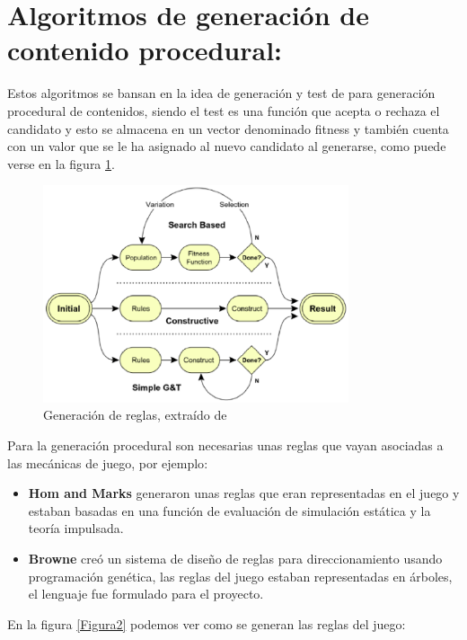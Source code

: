 \section{Algoritmos de generación de contenido procedural:}

Estos algoritmos se bansan en la idea de generación y test de para generación procedural de contenidos, siendo el test es una función que acepta o rechaza el candidato y esto se almacena en un vector denominado fitness y también cuenta con un valor que se le ha asignado al nuevo candidato  al generarse, como puede verse en la figura \ref{Figura1}\cite{B3}.

\begin{figure}[h!]

	\centering
	\includegraphics[width=9cm]{./eps/fig1.eps}
	\caption{Generación de reglas, extraído de \cite{B3}}
	\label{Figura1}

\end{figure}


Para la generación procedural son necesarias unas reglas que vayan asociadas a las mecánicas de juego, por ejemplo\cite{B3}:
\begin{itemize}
\item{\bf Hom and Marks} generaron unas reglas que eran representadas en el juego y estaban basadas en una función de evaluación de simulación estática y la teoría impulsada.

\item{\bf Browne} creó un sistema de diseño de reglas para direccionamiento usando programación genética, las reglas del juego estaban representadas en árboles, el lenguaje fue formulado para el proyecto.

\end{itemize}

\newpage
En la figura \ref{Figura2} podemos ver como se generan las reglas del juego:

